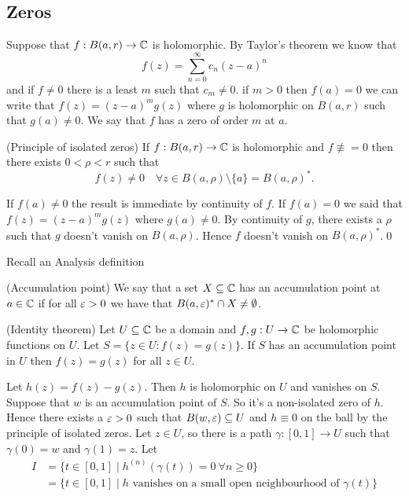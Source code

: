 \documentclass{article}
\begin{document}
\subsection{Zeros}
Suppose that $ f:B(a,r)\to \mathbb{C} $ is holomorphic. By Taylor's theorem we know that
\[
	f(z) = \sum_{n=0}^\infty c_n(z-a)^n
\]
and if $ f\ne 0 $ there is a least $ m $ such that $ c_m \ne 0 $. if $ m>0 $ then $ f(a) = 0 $ we can write that $ f(z) = (z-a)^mg(z) $ where $ g $ is holomorphic on $ B(a,r) $ such that $ g(a) \ne 0 $. We say that $ f $ has a zero of order $ m $ at $ a $.
\begin{proposition}
	(Principle of isolated zeros) If $ f:B(a,r)\to \mathbb{C} $ is holomorphic and $ f\not\equiv =0 $ then there exists $ 0<\rho <r $ such that
	\[
		f(z) \ne 0 \quad\forall z\in B(a,\rho)\setminus \{a\} = B(a,\rho)^*.
	\]
\end{proposition}
\pf If $ f(a) \ne 0 $ the result is immediate by continuity of $ f $. If $ f(a) = 0 $ we said that $ f(z) = (z-a)^m g(z) $ where $ g(a)\ne 0 $. By continuity of $ g $, there exists a $ \rho $ such that $ g $ doesn't vanish on $ B(a,\rho) $. Hence $ f $ doesn't vanish on $ B(a,\rho)^* $.\qed
\par
Recall an Analysis definition
\begin{definition}
	(Accumulation point) We say that a set $ X\subseteq \mathbb{C} $ has an accumulation point at $ a\in \mathbb{C} $ if for all $ \varepsilon>0 $ we have that $ B(a,\varepsilon)^* \cap X \ne \emptyset $.
\end{definition}
\begin{theorem}
	(Identity theorem) Let $ U\subseteq \mathbb{C} $ be a domain and $ f,g:U\to\mathbb{C} $ be holomorphic functions on $ U $. Let $ S = \{z\in U: f(z) = g(z)\} $. If $ S $ has an accumulation point in $ U $ then $ f(z) =g (z) $ for all $ z\in U $.
\end{theorem}
\pf Let $ h(z) = f(z) -g(z) $. Then $ h $ is holomorphic on $ U $ and vanishes on $ S $. Suppose that $ w $ is an accumulation point of $ S $. So it's a non-isolated zero of $ h $. Hence there exists a $ \varepsilon >0 $ such that $ B(w,\varepsilon)\subseteq U $ and $ h\equiv 0 $ on the ball by the principle of isolated zeros. Let $ z\in U $, so there is a path $ \gamma:[0,1] \to U $ such that $ \gamma(0) = w $ and $ \gamma(1) =z $. Let \begin{align*}
	I &= \{t\in [0,1]\mid h^{(n)}(\gamma(t))= 0 \ \forall n\ge 0 \}\\ 
	  &= \{ t\in [0,1] \mid h \text{ vanishes on a small open neighbourhood of } \gamma(t)\}
\end{align*}
\end{document}
